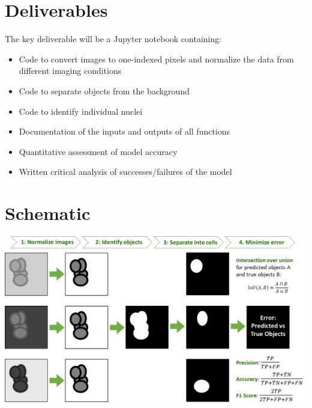 \documentclass[11pt]{article}
\begin{document}
\section{Deliverables}

The key deliverable will be a Jupyter notebook containing:

\begin{itemize}
\item Code to convert images to one-indexed pixels and normalize the data from different imaging conditions
\item Code to separate objects from the background
\item Code to identify individual nuclei
\item Documentation of the inputs and outputs of all functions
\item Quantitative assessment of model accuracy
\item Written critical analysis of successes/failures of the model
\end{itemize}

\section{Schematic}

\includegraphics[width=19cm]{schematic}
\end{document}

